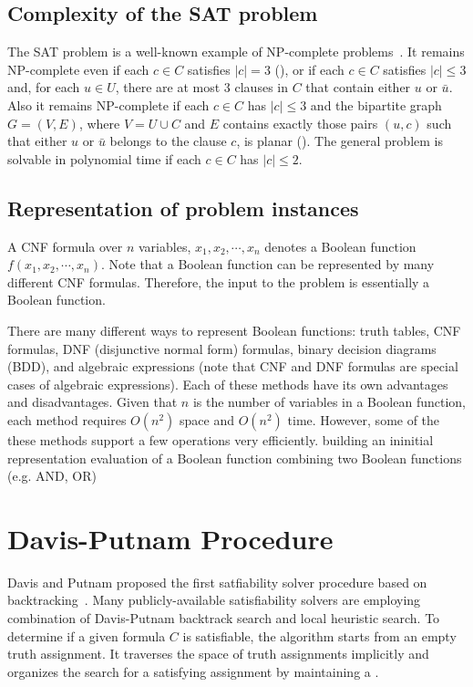 \subsection{Complexity of the SAT problem}
The SAT problem is a well-known example of NP-complete
problems~\cite{Cook71,GJ79}. 
It remains NP-complete even if each $c \in C$ satisfies
$|c| = 3$ (), or if each $c \in C$ satisfies $|c| \le 3$ and, for
each $u \in U$, there are at most 3 clauses in $C$ that contain either $u$ or
$\bar{u}$. 
Also it remains NP-complete if each $c \in C$ has $|c| \le 3$ and the
bipartite graph $G = (V, E)$, where $V = U \cup C$ and $E$ contains exactly
those pairs $(u, c)$ such that either $u$ or $\bar{u}$ belongs to the clause
$c$, is planar (). The general problem is solvable in polynomial
time if each $c \in C$ has $|c| \le 2$. 


\subsection{Representation of problem instances}
A CNF formula over $n$ variables, $x_1, x_2, \cdots, x_n$ 
denotes a Boolean function $f(x_1, x_2, \cdots, x_n)$. Note that a Boolean
function can be represented by many different CNF formulas.
Therefore, the input to the problem is essentially a Boolean function. 

There are many different ways to represent Boolean functions: truth tables,
CNF formulas, DNF (disjunctive normal form) formulas,  binary decision
diagrams (BDD), and algebraic expressions (note that CNF and DNF formulas are
special cases of algebraic expressions). Each of these methods have its
own advantages and disadvantages.
Given that $n$ is the number of variables in a Boolean function, 
each method requires $O(n^2)$ space and $O(n^2)$ time. 
However, some of the these methods support a few operations very efficiently.
\ben
\w building an ininitial representation
\w evaluation of a Boolean function
\w combining two Boolean functions (e.g. AND, OR)
\een


\section{Davis-Putnam Procedure}
Davis and Putnam proposed the first satfiability solver procedure 
based on backtracking~\cite{DP60}. Many publicly-available satisfiability 
solvers are employing combination of Davis-Putnam backtrack search and 
local heuristic search.  
To determine if a given formula $C$ is satisfiable, the algorithm starts from
an empty truth assignment. It traverses the space of truth assignments
implicitly and organizes the search for a satisfying assignment by maintaining
a . 

